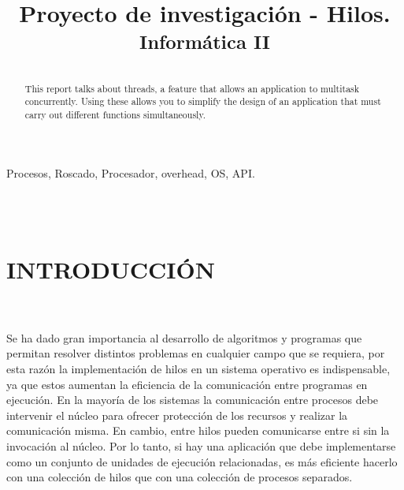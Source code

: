 \documentclass[conference]{IEEEtran}
\begin{document}
\title{Proyecto de investigación - Hilos.
\\
{\footnotesize\textsuperscript{Informática II}
}
}



\author{




}

\maketitle

\begin{abstract}

This report talks about threads, a feature that allows an application to multitask concurrently. Using these allows you to simplify the design of an application that must carry out different functions simultaneously. \\


\end{abstract}

\begin{IEEEkeywords}
Procesos, Roscado, Procesador, overhead, OS, API.
\end{IEEEkeywords}
\\
\\

\section{INTRODUCCIÓN}
\\
\\

Se ha dado gran importancia al desarrollo de algoritmos y programas que permitan resolver distintos problemas en cualquier campo que se requiera, por esta razón la implementación de hilos en un sistema operativo es indispensable, ya que estos aumentan la eficiencia de la comunicación entre programas en ejecución. En la mayoría de los sistemas la comunicación entre procesos debe intervenir el núcleo para ofrecer protección de los recursos y realizar la comunicación misma. En cambio, entre hilos pueden comunicarse entre si sin la invocación al núcleo. Por lo tanto, si hay una aplicación que debe implementarse como un conjunto de unidades de ejecución relacionadas, es más eficiente hacerlo con una colección de hilos que con una colección de procesos separados.
\\
\\
\end{document}

